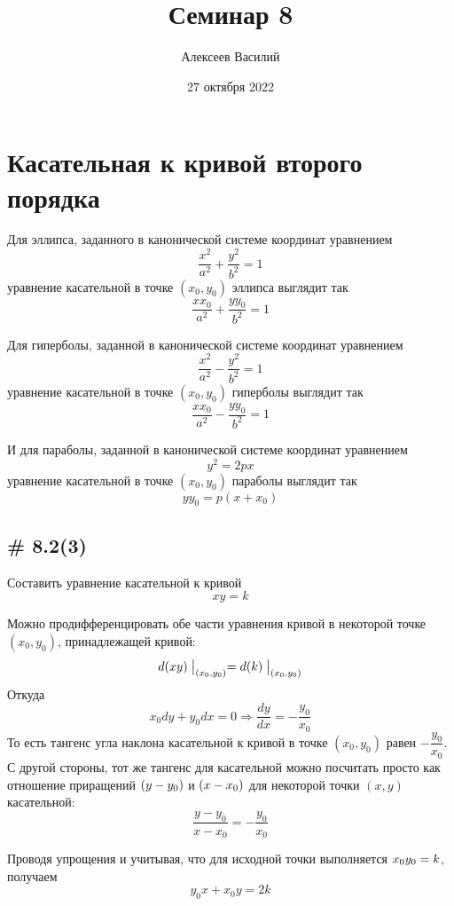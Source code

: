\documentclass[a4paper,12pt]{article}
\author{Алексеев Василий}
\title{Семинар 8}
\date{27 октября 2022}
\begin{document}
  \maketitle
  
  \tableofcontents

  \thispagestyle{empty}
  
  \newpage
  


  \section{Касательная к кривой второго порядка}
  
  Для эллипса, заданного в канонической системе координат уравнением
  \[
    \frac{x^2}{a^2} + \frac{y^2}{b^2} = 1
  \]
  уравнение касательной в точке $(x_0, y_0)$ эллипса выглядит так
  \[
    \boxed{\frac{xx_0}{a^2} + \frac{yy_0}{b^2} = 1}
  \]
  
  Для гиперболы, заданной в канонической системе координат уравнением
  \[
    \frac{x^2}{a^2} - \frac{y^2}{b^2} = 1
  \]
  уравнение касательной в точке $(x_0, y_0)$ гиперболы выглядит так
  \[
    \boxed{\frac{xx_0}{a^2} - \frac{yy_0}{b^2} = 1}
  \]
  
  И для параболы, заданной в канонической системе координат уравнением
  \[
    y^2 = 2px
  \]
  уравнение касательной в точке $(x_0, y_0)$ параболы выглядит так
  \[
    \boxed{yy_0 = p (x + x_0)}
  \]
  
  
  \subsection{\# 8.2(3)}
  
  Составить уравнение касательной к кривой
  \[
    xy = k
  \]

  \begin{solution}
    Можно продифференцировать обе части уравнения кривой в некоторой точке $(x_0, y_0)$, принадлежащей кривой:
    \[
      d(xy)\bigm|_{(x_0, y_0)} = d(k)\bigm|_{(x_0, y_0)}
    \]
    Откуда
    \[
      x_0 dy + y_0 dx = 0 \Rightarrow \frac{dy}{dx} = -\frac{y_0}{x_0}
    \]
    То есть тангенс угла наклона касательной к кривой в точке $(x_0, y_0)$ равен $-\dfrac{y_0}{x_0}$.
    С другой стороны, тот же тангенс для касательной можно посчитать просто как отношение приращений $(y \hm- y_0)$ и $(x \hm- x_0)$ для некоторой точки $(x, y)$ касательной:
    \[
      \frac{y - y_0}{x - x_0} = -\frac{y_0}{x_0}
    \]
    
    Проводя упрощения и учитывая, что для исходной точки выполняется $x_0 y_0 \hm= k$, получаем
    \[
      y_0 x + x_0 y = 2k
    \]
  \end{solution}
  
\end{document}
